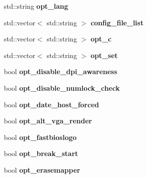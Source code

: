 \begin{DoxyCompactItemize}
\item 
\hypertarget{classConfig_a077860660ed77a40cf5ff1540873d9d6}{std\-::string {\bfseries opt\-\_\-lang}}\label{classConfig_a077860660ed77a40cf5ff1540873d9d6}

\item 
\hypertarget{classConfig_a4842020c7194c3b5c02980c2cd7c59d5}{std\-::vector$<$ std\-::string $>$ {\bfseries config\-\_\-file\-\_\-list}}\label{classConfig_a4842020c7194c3b5c02980c2cd7c59d5}

\item 
\hypertarget{classConfig_ace110896f67f0404622ef497e652ea3b}{std\-::vector$<$ std\-::string $>$ {\bfseries opt\-\_\-c}}\label{classConfig_ace110896f67f0404622ef497e652ea3b}

\item 
\hypertarget{classConfig_a217c10c2f56cbd0a2c61cec69629fe30}{std\-::vector$<$ std\-::string $>$ {\bfseries opt\-\_\-set}}\label{classConfig_a217c10c2f56cbd0a2c61cec69629fe30}

\item 
\hypertarget{classConfig_a64fd0847634fc174dbd521607116a0c7}{bool {\bfseries opt\-\_\-disable\-\_\-dpi\-\_\-awareness}}\label{classConfig_a64fd0847634fc174dbd521607116a0c7}

\item 
\hypertarget{classConfig_a9265412e49f5228d63c506ceab66a6c2}{bool {\bfseries opt\-\_\-disable\-\_\-numlock\-\_\-check}}\label{classConfig_a9265412e49f5228d63c506ceab66a6c2}

\item 
\hypertarget{classConfig_a84bdd8a5d672f1e15b2ac8f5eca497ff}{bool {\bfseries opt\-\_\-date\-\_\-host\-\_\-forced}}\label{classConfig_a84bdd8a5d672f1e15b2ac8f5eca497ff}

\item 
\hypertarget{classConfig_a5c66912f39283a6b2b4ebc87867cfc91}{bool {\bfseries opt\-\_\-alt\-\_\-vga\-\_\-render}}\label{classConfig_a5c66912f39283a6b2b4ebc87867cfc91}

\item 
\hypertarget{classConfig_a7a559bbc38f1b51bef7115e31405da2c}{bool {\bfseries opt\-\_\-fastbioslogo}}\label{classConfig_a7a559bbc38f1b51bef7115e31405da2c}

\item 
\hypertarget{classConfig_abbaadb9fcb5ab3065a8728cf271e4bc8}{bool {\bfseries opt\-\_\-break\-\_\-start}}\label{classConfig_abbaadb9fcb5ab3065a8728cf271e4bc8}

\item 
\hypertarget{classConfig_ae4e0136fb9b65400cb317f60e3c1b64d}{bool {\bfseries opt\-\_\-erasemapper}}\label{classConfig_ae4e0136fb9b65400cb317f60e3c1b64d}


\end{DoxyCompactItemize}
